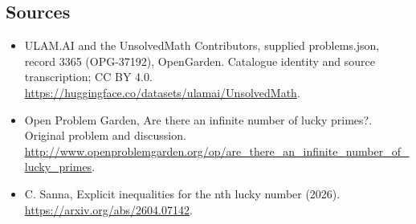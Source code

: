 \documentclass[11pt,a4paper]{article}
\begin{document}
\subsection{Sources}
\begin{itemize}
\item[S1] ULAM.AI and the UnsolvedMath Contributors, supplied problems.json, record 3365 (OPG-37192), OpenGarden. Catalogue identity and source transcription; CC BY 4.0.
\url{https://huggingface.co/datasets/ulamai/UnsolvedMath}.
\item[S2] Open Problem Garden, Are there an infinite number of lucky primes?. Original problem and discussion.
\url{http://www.openproblemgarden.org/op/are_there_an_infinite_number_of_lucky_primes}.
\item[S3] C. Sanna, Explicit inequalities for the nth lucky number (2026).
\url{https://arxiv.org/abs/2604.07142}.
\end{itemize}
\end{document}

